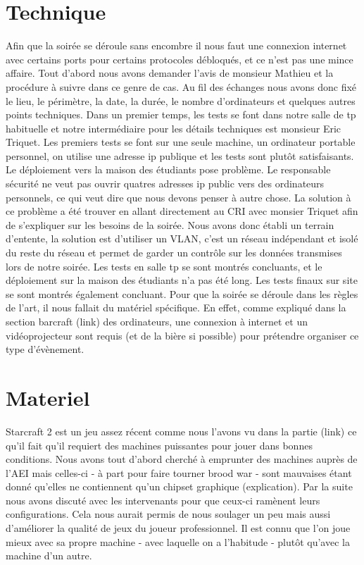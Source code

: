 \section{Technique}%
\label{sec:technique}

Afin que la soirée se déroule sans encombre il nous faut une connexion
internet avec certains ports pour certains protocoles débloqués, et ce
n'est pas une mince affaire. Tout d'abord nous avons demander l'avis de
monsieur Mathieu et la procédure à suivre dans ce genre de cas. Au fil
des échanges nous avons donc fixé le lieu, le périmètre, la date, la
durée, le nombre d'ordinateurs et quelques autres points techniques.
Dans un premier temps, les tests se font dans notre salle de tp
habituelle et notre intermédiaire pour les détails techniques est
monsieur Eric Triquet.  Les premiers tests se font sur une seule machine,
un ordinateur portable personnel, on utilise une adresse ip publique et les
tests sont plutôt satisfaisants. Le déploiement vers la maison des
étudiants pose problème. Le responsable sécurité ne veut pas ouvrir
quatres adresses ip public vers des ordinateurs personnels, ce qui veut
dire que nous devons penser à autre chose.  La solution à ce problème a
été trouver en allant directement au CRI avec monsier Triquet afin de
s'expliquer sur les besoins de la soirée.  Nous avons donc établi un
terrain d'entente, la solution est d'utiliser un VLAN, c'est un réseau
indépendant et isolé du reste du réseau et permet de garder un contrôle
sur les données transmises lors de notre soirée.  Les tests en salle tp
se sont montrés concluants, et le déploiement sur la maison des
étudiants n'a pas été long.  Les tests finaux sur site se sont montrés
également concluant.
Pour que la soirée se déroule dans les règles de l'art, il nous fallait
du matériel spécifique. En effet, comme expliqué dans la section
barcraft (link) des ordinateurs, une connexion à internet et un
vidéoprojecteur sont requis (et de la bière si possible) pour prétendre
organiser ce type d'évènement.

\section{Materiel}%
\label{sec:materiel}

  Starcraft 2 est un jeu assez récent comme nous l'avons vu dans la
partie (link) ce qu'il fait qu'il requiert des machines puissantes pour jouer
dans bonnes conditions. Nous avons tout d'abord cherché à emprunter des
machines auprès de l'AEI mais celles-ci - à part pour faire tourner brood
war - sont mauvaises étant donné qu'elles ne contiennent qu'un chipset
graphique (explication). Par la suite nous avons discuté avec les
intervenants pour que ceux-ci ramènent leurs configurations. Cela nous
aurait permis de nous soulager un peu mais aussi d'améliorer la qualité
de jeux du joueur professionnel. Il est connu que l'on joue mieux avec sa
propre machine - avec laquelle on a l'habitude - plutôt qu'avec la machine d'un
autre.

